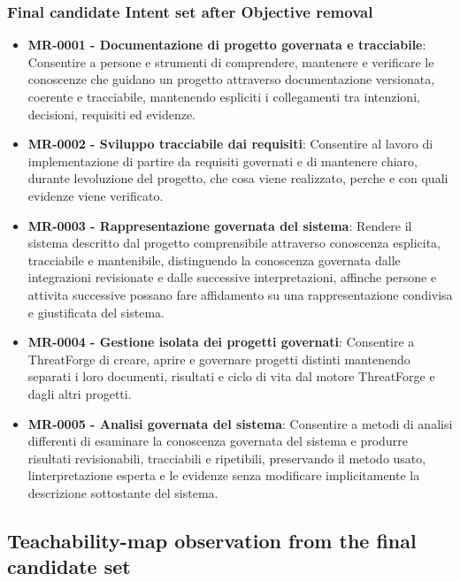 \documentclass[
  10pt,
]{article}
\providecommand{\tightlist}{%
  \setlength{\itemsep}{0pt}\setlength{\parskip}{0pt}}
\begin{document}
\subsubsection{Final candidate Intent set after Objective
removal}\label{final-candidate-intent-set-after-objective-removal}

\begin{itemize}
\tightlist
\item
  \textbf{MR-0001 - Documentazione di progetto governata e tracciabile}:
  Consentire a persone e strumenti di comprendere, mantenere e
  verificare le conoscenze che guidano un progetto attraverso
  documentazione versionata, coerente e tracciabile, mantenendo
  espliciti i collegamenti tra intenzioni, decisioni, requisiti ed
  evidenze.
\item
  \textbf{MR-0002 - Sviluppo tracciabile dai requisiti}: Consentire al
  lavoro di implementazione di partire da requisiti governati e di
  mantenere chiaro, durante l\textquotesingle evoluzione del progetto,
  che cosa viene realizzato, perche e con quali evidenze viene
  verificato.
\item
  \textbf{MR-0003 - Rappresentazione governata del sistema}: Rendere il
  sistema descritto dal progetto comprensibile attraverso conoscenza
  esplicita, tracciabile e mantenibile, distinguendo la conoscenza
  governata dalle integrazioni revisionate e dalle successive
  interpretazioni, affinche persone e attivita successive possano fare
  affidamento su una rappresentazione condivisa e giustificata del
  sistema.
\item
  \textbf{MR-0004 - Gestione isolata dei progetti governati}: Consentire
  a ThreatForge di creare, aprire e governare progetti distinti
  mantenendo separati i loro documenti, risultati e ciclo di vita dal
  motore ThreatForge e dagli altri progetti.
\item
  \textbf{MR-0005 - Analisi governata del sistema}: Consentire a metodi
  di analisi differenti di esaminare la conoscenza governata del sistema
  e produrre risultati revisionabili, tracciabili e ripetibili,
  preservando il metodo usato, l\textquotesingle interpretazione esperta
  e le evidenze senza modificare implicitamente la descrizione
  sottostante del sistema.
\end{itemize}

\subsection{Teachability-map observation from the final candidate
set}\label{teachability-map-observation-from-the-final-candidate-set}
\end{document}
